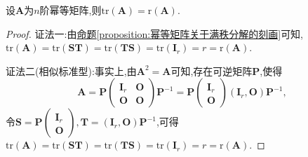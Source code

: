 \documentclass[../../main.tex]{subfiles}%
\begin{document}
\begin{corollary}[幂等矩阵的迹和秩相等]\label{corollary:幂等矩阵的迹和秩相等}
设\(\boldsymbol{A}\)为\(n\)阶幂等矩阵,则\(\mathrm{tr}(\boldsymbol{A})=\mathrm{r}(\boldsymbol{A})\).
\end{corollary}
\begin{proof}

{\color{blue}证法一:}由\hyperref[proposition:幂等矩阵关于满秩分解的刻画]{命题\ref{proposition:幂等矩阵关于满秩分解的刻画}}可知,\(\mathrm{tr}(\boldsymbol{A})=\mathrm{tr}(\boldsymbol{S}\boldsymbol{T})=\mathrm{tr}(\boldsymbol{T}\boldsymbol{S})=\mathrm{tr}(\boldsymbol{I}_r)=r=\mathrm{r}(\boldsymbol{A})\).

{\color{blue}证法二(相似标准型):}事实上,由\(\boldsymbol{A}^2=\boldsymbol{A}\)可知,存在可逆矩阵\(\boldsymbol{P}\),使得
\[
\boldsymbol{A}=\boldsymbol{P}\begin{pmatrix}
\boldsymbol{I}_r&\boldsymbol{O}\\
\boldsymbol{O}&\boldsymbol{O}
\end{pmatrix}\boldsymbol{P}^{-1}=\boldsymbol{P}\begin{pmatrix}
\boldsymbol{I}_r\\
\boldsymbol{O}
\end{pmatrix}(\boldsymbol{I}_r,\boldsymbol{O})\boldsymbol{P}^{-1},
\]
令\(\boldsymbol{S}=\boldsymbol{P}\begin{pmatrix}
\boldsymbol{I}_r\\
\boldsymbol{O}
\end{pmatrix},\boldsymbol{T}=(\boldsymbol{I}_r,\boldsymbol{O})\boldsymbol{P}^{-1}\),可得\(\mathrm{tr}(\boldsymbol{A})=\mathrm{tr}(\boldsymbol{S}\boldsymbol{T})=\mathrm{tr}(\boldsymbol{T}\boldsymbol{S})=\mathrm{tr}(\boldsymbol{I}_r)=r=\mathrm{r}(\boldsymbol{A})\).

\end{proof}
\end{document}
